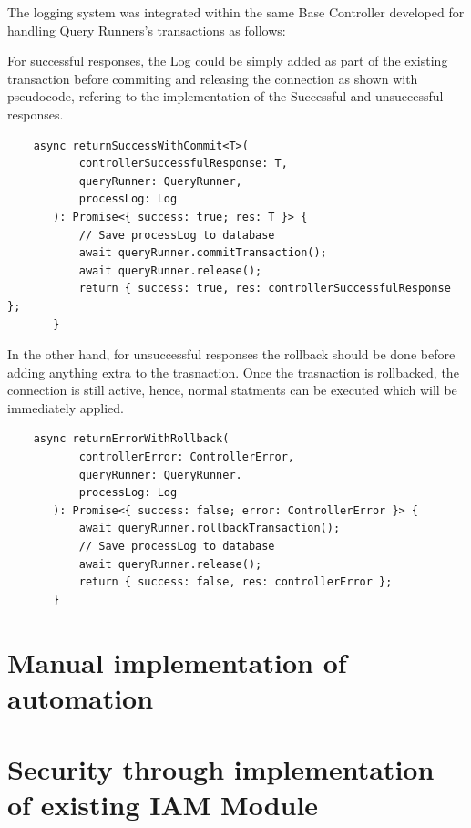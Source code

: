 The logging system was integrated within the same Base Controller developed for handling Query Runners's transactions as follows:

For successful responses, the Log could be simply added as part of the existing transaction before commiting and releasing the connection as shown with pseudocode, refering to the implementation of the Successful and unsuccessful responses.

\begin{verbatim}
    async returnSuccessWithCommit<T>(
           controllerSuccessfulResponse: T,
           queryRunner: QueryRunner,
           processLog: Log
       ): Promise<{ success: true; res: T }> {
           // Save processLog to database
           await queryRunner.commitTransaction();
           await queryRunner.release();
           return { success: true, res: controllerSuccessfulResponse };
       }
\end{verbatim}

In the other hand, for unsuccessful responses the rollback should be done before adding anything extra to the trasnaction.  Once the trasnaction is rollbacked, the connection is still active, hence, normal statments can be executed which will be immediately applied.

\begin{verbatim}
    async returnErrorWithRollback(
           controllerError: ControllerError,
           queryRunner: QueryRunner.
           processLog: Log
       ): Promise<{ success: false; error: ControllerError }> {
           await queryRunner.rollbackTransaction();
           // Save processLog to database
           await queryRunner.release();
           return { success: false, res: controllerError };
       }
    \end{verbatim}

\section{Manual implementation of automation}

\section{Security through implementation of existing IAM Module}
